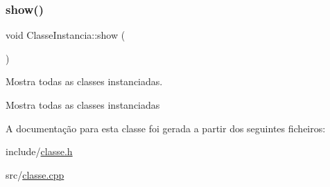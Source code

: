 \subsubsection{\texorpdfstring{show()}{show()}}
{\footnotesize\ttfamily void Classe\+Instancia\+::show (\begin{DoxyParamCaption}{ }\end{DoxyParamCaption})}



Mostra todas as classes instanciadas. 

Mostra todas as classes instanciadas 

A documentação para esta classe foi gerada a partir dos seguintes ficheiros\+:\begin{DoxyCompactItemize}
\item 
include/\hyperlink{classe_8h}{classe.\+h}\item 
src/\hyperlink{classe_8cpp}{classe.\+cpp}\end{DoxyCompactItemize}
